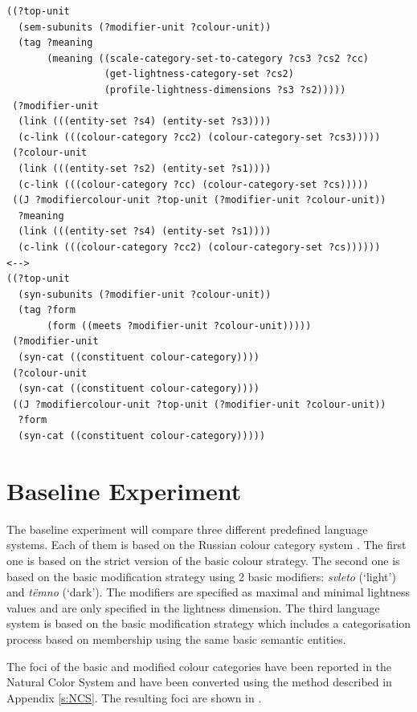 \footnotesize
{}
\begin{lstlisting}
((?top-unit
  (sem-subunits (?modifier-unit ?colour-unit))
  (tag ?meaning
       (meaning ((scale-category-set-to-category ?cs3 ?cs2 ?cc)
                 (get-lightness-category-set ?cs2)
                 (profile-lightness-dimensions ?s3 ?s2)))))
 (?modifier-unit
  (link (((entity-set ?s4) (entity-set ?s3))))
  (c-link (((colour-category ?cc2) (colour-category-set ?cs3)))))
 (?colour-unit
  (link (((entity-set ?s2) (entity-set ?s1))))
  (c-link (((colour-category ?cc) (colour-category-set ?cs)))))
 ((J ?modifiercolour-unit ?top-unit (?modifier-unit ?colour-unit))
  ?meaning
  (link (((entity-set ?s4) (entity-set ?s1))))
  (c-link (((colour-category ?cc2) (colour-category-set ?cs))))))
<-->
((?top-unit
  (syn-subunits (?modifier-unit ?colour-unit))
  (tag ?form 
       (form ((meets ?modifier-unit ?colour-unit)))))
 (?modifier-unit 
  (syn-cat ((constituent colour-category))))
 (?colour-unit 
  (syn-cat ((constituent colour-category))))
 ((J ?modifiercolour-unit ?top-unit (?modifier-unit ?colour-unit))
  ?form
  (syn-cat ((constituent colour-category)))))
\end{lstlisting}
\normalsize

\section{Baseline Experiment}

The baseline experiment will compare three different predefined language
systems. Each of them is based on the Russian colour category system
\citep{safuanova07russian}. The first one is based on the strict
version of the basic colour strategy. The second one is based
on the basic modification strategy using 2 basic
modifiers: \textit{svleto} (`light') and \textit{t\"emno} (`dark'). The modifiers
are specified as maximal and minimal lightness values and are only
specified in the lightness dimension. The third language system is
based on the basic modification strategy which includes a
categorisation process based on membership using the same basic
semantic entities.

The foci of the basic and modified colour categories have been
reported in the Natural Color System \citep{safuanova07russian} and
have been converted using the method described in Appendix
\ref{s:NCS}. The resulting foci are shown in .

